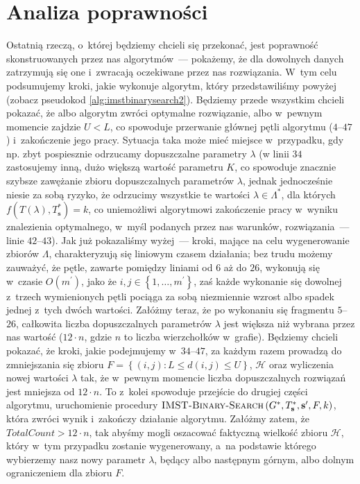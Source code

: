 



\section{Analiza poprawności}




Ostatnią rzeczą, o~której będziemy chcieli się przekonać, jest poprawność skonstruowanych przez nas algorytmów~--- pokażemy, że dla dowolnych danych zatrzymują się one i~zwracają oczekiwane przez nas rozwiązania.
W~tym celu podsumujemy kroki, jakie wykonuje algorytm, który przedstawiliśmy powyżej (zobacz pseudokod \ref{alg:imstbinarysearch2}). 
Będziemy przede wszystkim chcieli pokazać, że albo algorytm zwróci optymalne rozwiązanie, albo w~pewnym momencie zajdzie $U < L$, co spowoduje przerwanie głównej pętli algorytmu ($4$--$47$) i~zakończenie jego pracy.
Sytuacja taka może mieć miejsce w~przypadku, gdy np. zbyt pospiesznie odrzucamy dopuszczalne parametry $\lambda$ (w linii $34$ zastosujemy inną, dużo większą wartość parametru $K$, co spowoduje znacznie szybsze zawężanie zbioru dopuszczalnych parametrów $\lambda$, jednak jednocześnie niesie za sobą ryzyko, że odrzucimy wszystkie te wartości $\lambda \in \Lambda^{\ast}$, dla których $f \left( T \left( \lambda \right), T^{\ast}_{\textbf{s}} \right) = k$, co uniemożliwi algorytmowi zakończenie pracy w~wyniku znalezienia optymalnego, w~myśl podanych przez nas warunków, rozwiązania~--- linie $42$--$43$).
Jak już pokazaliśmy wyżej~--- kroki, mające na celu wygenerowanie zbiorów $\Lambda$, charakteryzują się liniowym czasem działania; bez trudu możemy zauważyć, że pętle, zawarte pomiędzy liniami od $6$ aż do $26$, wykonują się w~czasie $O \left( m^{\prime} \right)$, jako że $i, j \in \left\{ 1, \dots, m^{\prime} \right\}$, zaś każde wykonanie się dowolnej z~trzech wymienionych pętli pociąga za sobą niezmiennie wzrost albo spadek jednej z~tych dwóch wartości.
Załóżmy teraz, że po wykonaniu się fragmentu $5$--$26$, całkowita liczba dopuszczalnych parametrów $\lambda$ jest większa niż wybrana przez nas wartość ($12 \cdot n$, gdzie $n$ to liczba wierzchołków w~grafie).
Będziemy chcieli pokazać, że kroki, jakie podejmujemy w~$34$--$47$, za każdym razem prowadzą do zmniejszania się zbioru $F = \left\{ \left( i, j \right) : L \leqslant d \left( i, j \right) \leqslant U \right\}$, $\mathcal{H}$ oraz wyliczenia nowej wartości $\lambda$ tak, że w~pewnym momencie liczba dopuszczalnych rozwiązań jest mniejsza od $12 \cdot n$.
To z~kolei spowoduje przejście do drugiej części algorytmu, uruchomienie procedury $\textsc{IMST-Binary-Search} \left( G^{\ast}, T^{\ast}_{\textbf{s}}, \textbf{s}^{\prime}, F, k \right)$, która zwróci wynik i~zakończy działanie algorytmu.
Załóżmy zatem, że $TotalCount > 12 \cdot n$, tak abyśmy mogli oszacować faktyczną wielkość zbioru $\mathcal{H}$, który w~tym przypadku zostanie wygenerowany, a~na podstawie którego wybierzemy nasz nowy parametr $\lambda$, będący albo następnym górnym, albo dolnym ograniczeniem dla zbioru $F$.

